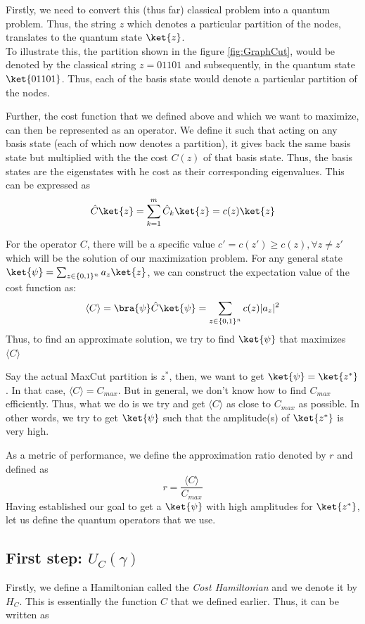 Firstly, we need to convert this (thus far) classical problem into a quantum problem. Thus, the string $z$ which denotes a particular partition of the nodes, translates to the quantum state $\ket{z}$.\\
To illustrate this, the partition shown in the figure \ref{fig:GraphCut}, would be denoted by the classical string $z = 01101$ and subsequently, in the quantum state $\ket{01101}$.
Thus, each of the basis state would denote a particular partition of the nodes.

Further, the cost function that we defined above and which we want to maximize, can then be represented as an operator.
We define it such that acting on any basis state (each of which now denotes a partition), it gives back the same basis state but multiplied with the the cost $C(z)$ of that basis state.
Thus, the basis states are the eigenstates with he cost as their corresponding eigenvalues. This can be expressed as
\begin{equation}
    \hat{C}\ket{z}= \sum_{k=1}^m \hat{C}_k\ket{z} = c(z)\ket{z}
    \label{equation:cost_op}
\end{equation}

For the operator $C$, there will be a specific value $c'=c(z')\geq c(z),\forall z\neq z'$ which will be the solution of our maximization problem.
For any general state $\ket{\psi}=\sum_{z \in\{0,1\}^n}a_z\ket{z}$, we can construct the expectation value of the cost function as:
\[
    \left\langle C\right\rangle =\bra{\psi}\hat{C}\ket{\psi} = \sum_{z \in\{0,1\}^n}c(z)|a_z|^2
\]
Thus, to find an approximate solution, we try to find $\ket{\psi}$ that maximizes $\langle C \rangle$

Say the actual MaxCut partition is $z^*$, then, we want to get $\ket{\psi} = \ket{z^*}$.
In that case, $\langle C \rangle = C_{max}$.
But in general, we don't know how to find $C_{max}$ efficiently.
Thus, what we do is we try and get $\langle C \rangle$ as close to $C_{max}$ as possible.
In other words, we try to get $\ket{\psi}$ such that the amplitude(s) of $\ket{z^*}$ is very high.

As a metric of performance, we define the approximation ratio denoted by $r$ and defined as
$$r = \frac{ \langle C \rangle }{C_{max}} $$
Having established our goal to get a $\ket{\psi}$ with high amplitudes for $\ket{z^*}$, let us define the quantum operators that we use.
\subsection{First step: $U_C(\gamma)$}
Firstly, we define a Hamiltonian called the \textit{Cost Hamiltonian} and we denote it by $H_C$.
This is essentially the function $C$ that we defined earlier.
Thus, it can be written as


